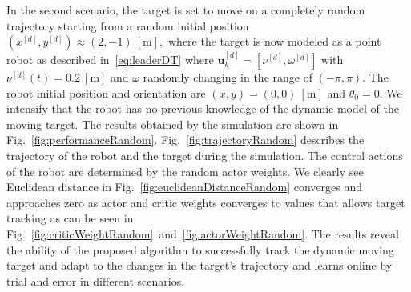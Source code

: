 \documentclass[conference]{IEEEtran}
\begin{document}
In the second scenario, the target is set to move on a completely random trajectory starting from a random initial position $(x^{[d]},y^{[d]})\approx (2,-1)~[\si{\meter}],$ where the target is now modeled as a point robot as described in~\eqref{eq:leaderDT}
where $\mathbf{u}_k^{[d]}=[\nu^{[d]},\omega^{[d]}] $ with
$\nu^{[d]}(t)=0.2~[\si{\meter}]$ and $\omega$ randomly changing in the range of
$({-\pi},{\pi}) $. The robot initial position and orientation are $(x,y) =
(0,0)~[\si{\meter}]$ and $\theta_0=0$. We intensify that the robot has no
previous knowledge of the dynamic model of the moving target. The results
obtained by the simulation are shown in Fig.~\ref{fig:performanceRandom}. Fig.~\ref{fig:trajectoryRandom} describes the trajectory of the robot and the target
during the simulation. The control actions of the robot are determined by the
random actor weights. We clearly see Euclidean distance in Fig.~\ref{fig:euclideanDistanceRandom} converges and approaches zero as actor and
critic weights converges to values that allows target tracking as can be seen in
Fig.~\ref{fig:criticWeightRandom}~and~\ref{fig:actorWeightRandom}. The results
reveal the ability of the proposed algorithm to successfully track the dynamic
moving target and adapt to the changes in the target's trajectory and learns
online by trial and error in different scenarios. %
%    
\end{document}
